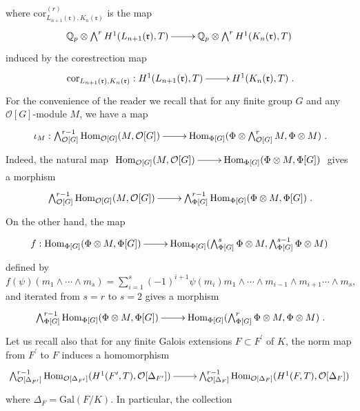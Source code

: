 \documentclass[reqno]{amsart}
\begin{document}
where
$\mathrm{cor}_{L_{n+1}(\mathfrak{r}),K_{n}(\mathfrak{r})}^{(r)}$ is
the map
$$
\xymatrix@=2pc{ \mathbb{Q}_{p}\otimes
\bigwedge^{r}H^{1}(L_{n+1}(\mathfrak{r}),T)\ar[r]&
\mathbb{Q}_{p}\otimes \bigwedge^{r}H^{1}(K_{n}(\mathfrak{r}),T)}
$$
induced by the corestrection map
$$
\xymatrix@=2pc{
\mathrm{cor}_{L_{n+1}(\mathfrak{r}),K_{n}(\mathfrak{r})}:
H^{1}(L_{n+1}(\mathfrak{r}),T)\ar[r]& H^{1}(K_{n}(\mathfrak{r}),T)}.
$$
For the convenience of the reader we recall that for any  finite
group $G$ and any  $\mathcal{O}[G]$-module $M$, we have a map
\begin{equation}\label{morphism  iota}
\xymatrix@=2pc{\iota_{M}:
\bigwedge^{r-1}_{\mathcal{O}[G]}\mathrm{Hom}_{\mathcal{O}[G]}(M,\mathcal{O}[G])\ar[r]&
\mathrm{Hom}_{\Phi[G]}(\Phi\otimes\bigwedge^{r}_{\mathcal{O}[G]}M,\Phi\otimes
M)}.
\end{equation}
Indeed, the natural map
$\xymatrix@=2pc{\mathrm{Hom}_{\mathcal{O}[G]}(M,\mathcal{O}[G])\ar[r]&
\mathrm{Hom}_{\Phi[G]}(\Phi\otimes M,\Phi[G])}$ gives a morphism
$$
\xymatrix@=2pc{\bigwedge^{r-1}_{\mathcal{O}[G]}\mathrm{Hom}_{\mathcal{O}[G]}(M,\mathcal{O}[G])\ar[r]&
\bigwedge^{r-1}_{\Phi[G]}\mathrm{Hom}_{\Phi[G]}(\Phi\otimes
M,\Phi[G])}.
$$
On the other hand, the map
$$
\xymatrix@=2pc{f: \mathrm{Hom}_{\Phi[G]}(\Phi\otimes
M,\Phi[G])\ar[r]& \mathrm{Hom}_{\Phi[G]}(\bigwedge^{s}_{\Phi[G]}
\Phi\otimes M,\bigwedge^{s-1}_{\Phi[G]}\Phi\otimes M)}
$$
 defined by
 $f(\psi)(m_{1}\wedge\cdots\wedge
 m_{s})=\displaystyle{\sum_{i=1}^{s}}(-1)^{i+1}\psi(m_{i})m_{1}\wedge\cdots\wedge
m_{i-1}\wedge m_{i+1}\cdots\wedge m_{s},$ and
 iterated from $s=r$ to $s=2$ gives a morphism
\begin{equation*}\label{Morphism de Rubin in power extor}
\xymatrix@=2pc{ \bigwedge^{r-1}_{\Phi[G]}\mathrm{Hom}_{\Phi[G]}(
\Phi\otimes
M,\Phi[G])\ar[r]&\mathrm{Hom}_{\Phi[G]}(\bigwedge^{r}_{\Phi[G]}
\Phi\otimes M,\Phi\otimes M)}.
\end{equation*}
Let us recall also that for any finite Galois extensions $F\subset
F^{\prime}$ of $K$, the norm map from $F^{\prime}$ to $F$ induces a
homomorphism
\begin{equation}\label{map induced by restriction and group}
\xymatrix@=2pc{
\bigwedge^{r-1}_{\mathcal{O}[\Delta_{F^{\prime}}]}\mathrm{Hom}_{\mathcal{O}[\Delta_{F^{\prime}}]}(H^{1}(F^{\prime},T),\mathcal{O}[\Delta_{F^{\prime}}])\ar[r]
&
\bigwedge^{r-1}_{\mathcal{O}[\Delta_{F}]}\mathrm{Hom}_{\mathcal{O}[\Delta_{F}]}(H^{1}(F,T),\mathcal{O}[\Delta_{F}])}
\end{equation}
where $\Delta_{F}=\mathrm{Gal}(F/K)$. In particular, the collection
\end{document}

